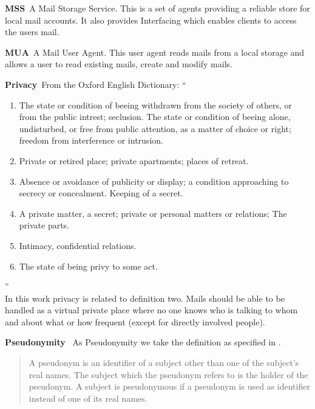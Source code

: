 \documentclass[a4paper,appendixprefix,pdfusetitle,twocolumn,fontsize=8pt,attachdocs,draft,status=draft]{scrbook}
\newenvironment{entry}{\par\leavevmode\hangpara{1.5mm}{1}\ignorespaces}{\RaggedRight\par}
\newcommand*{\mainentry}[2]{{\bfseries{#1\label{def:#1}}}~#2\par}
\begin{document}
\begin{entry}
  \mainentry{MSS}{A Mail Storage Service. This is a set of agents providing a reliable store for local mail accounts. It also provides Interfacing which enables clients to access the users mail.}
\end{entry}

\begin{entry}
  \mainentry{MUA}{A Mail User Agent. This user agent reads mails from a local storage and allows a user to read existing mails, create and modify mails.}
\end{entry}

\begin{entry}
  \mainentry{Privacy}{From the Oxford English Dictionary: ``
    \begin{enumerate}
      \item The state or condition of beeing withdrawn from the society of others, or from the public intrest; seclusion. The state or condition of beeing alone, undisturbed, or free from public attention, as a matter of choice or right; freedom from interference or intrusion.
      \item Private or retired place; private apartments; places of retreat.
      \item Absence or avoidance of publicity or display; a condition approaching to secrecy or concealment. Keeping of a secret.
      \item A private matter, a secret; private or personal matters or relations; The private parts.
      \item Intimacy, confidential relations.
      \item The state of being privy to some act.
    \end{enumerate}''\cite{OXFORD}\\
    In this work privacy is related to definition two. Mails should be able to be handled as a virtual private place where no one knows who is talking to whom and about what or how frequent (except for directly involved people).
  }
\end{entry}

\begin{entry}
	\mainentry{Pseudonymity}{
		As Pseudonymity we take the definition as specified in \cite{anon_terminology}.
		\begin{quote}
			A pseudonym is an identifier of a subject other than one of the subject's real names. The subject which the pseudonym refers to is the holder of the pseudonym. A subject is pseudonymous if a pseudonym is used as identifier instead of one of its real names.\omitted
		\end{quote}
	}
\end{entry}
\end{document}
